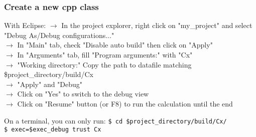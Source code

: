 \documentclass[10pt, hyperref={unicode=true,pdfusetitle, bookmarks=true,bookmarksnumbered=false,bookmarksopen=false, breaklinks=false,pdfborder={0 0 1},backref=true,colorlinks=true,linkcolor=darkblue,pageanchor, urlcolor=darkblue}]{beamer}
\begin{document}
\begin{frame}
\frametitle{Create a new cpp class}

\begin{exampleblock}{With Eclipse:}
    $\rightarrow$ In the project explorer, right click on "my\_project" and select "Debug As/Debug configurations..." \\
    $\rightarrow$ In "Main" tab, check "Disable auto build" then click on "Apply"\\
    $\rightarrow$ In "Arguments" tab, fill "Program arguments:" with "Cx"\\
    $\rightarrow$ "Working directory:" Copy the path to datafile matching \$project\_directory/build/Cx\\
    $\rightarrow$ "Apply" and "Debug"\\
    $\rightarrow$ Click on "Yes" to switch to the debug view\\
    $\rightarrow$ Click on "Resume" button (or F8) to run the calculation until the end\\
\end{exampleblock}    

\begin{block}{On a terminal, you can only run:}
    \texttt{\$ cd \$project\_directory/build/Cx/}\\
    \texttt{\$ exec=\$exec\_debug trust Cx}\\
\end{block}    
    

\end{frame}
\end{document}
